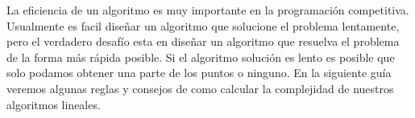 La eficiencia de un algoritmo es muy importante en la programación competitiva. Usualmente es facil diseñar un algoritmo que solucione el problema lentamente, pero el verdadero desafío esta en diseñar un algoritmo que resuelva el problema de la forma más rápida posible. Si el algoritmo solución es lento es posible que solo podamos obtener una parte de los puntos o ninguno. En la siguiente guía veremos algunas reglas y consejos de como calcular la complejidad de nuestros algoritmos lineales.


